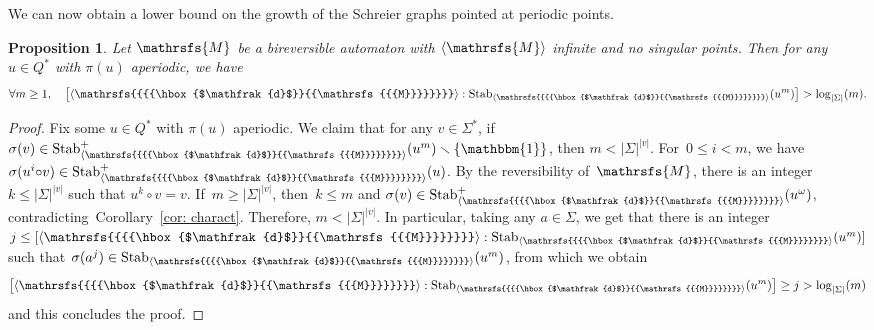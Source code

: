 \documentclass{amsart}
\newtheorem{proposition}[theorem]{Proposition}
\begin{document}
We can now obtain a lower bound on the growth of the Schreier graphs pointed at periodic points.
\begin{proposition}
Let ${{{\mathrsfs{{M}}}}}$ be a bireversible automaton with ${{{\langle}{{\mathrsfs{{{M}}}}}{\rangle}}}$ infinite and no singular points. Then for any $u\in {{{Q}}}^{*}$ with $\pi(u)$ aperiodic, we have
$$
\forall m\ge 1, \quad
\left[{{{{\langle}{{\mathrsfs{{{{\hbox{$\mathfrak{d}$}}{{\mathrsfs{{{M}}}}}}}}}}{\rangle}}}}:\operatorname{Stab}_{{{{\langle}{{\mathrsfs{{{{\hbox{$\mathfrak{d}$}}{{\mathrsfs{{{M}}}}}}}}}}{\rangle}}}}(u^{m})\right ]> \log_{|{{{\Sigma}}}|}(m).
$$
\end{proposition}
\begin{proof}
Fix some \(u\in {{{Q}}}^*\) with $\pi(u)$ aperiodic. We claim that for any $v\in {{{\Sigma}}}^{*}$, if
$\sigma(v)\in\operatorname{Stab}_{{{{\langle}{{\mathrsfs{{{{\hbox{$\mathfrak{d}$}}{{\mathrsfs{{{M}}}}}}}}}}{\rangle}}}}^{+}(u^{m})\smallsetminus\{\operatorname{\mathbbm{1}}\}$, then $m<|{{{\Sigma}}}|^{|v|}$. For~$0\le i<m$, we have $\sigma(u^{i}{{{\circ}}} v)\in \operatorname{Stab}^+_{{{{\langle}{{\mathrsfs{{{{\hbox{$\mathfrak{d}$}}{{\mathrsfs{{{M}}}}}}}}}}{\rangle}}}}(u)$. By the reversibility of~${{{\mathrsfs{{M}}}}}$, there is an integer $k\leq|{{{\Sigma}}}|^{|v|}$ such that $u^{k}{{{\circ}}} v=v$.
If~$m\geq|{{{\Sigma}}}|^{|v|}$, then~$k\leq m$ and $\sigma(v)\in \operatorname{Stab}^{+}_{{{{\langle}{{\mathrsfs{{{{\hbox{$\mathfrak{d}$}}{{\mathrsfs{{{M}}}}}}}}}}{\rangle}}}}(u^{\omega})$, contradicting~Corollary~\ref{cor: charact}. Therefore, $m<|{{{\Sigma}}}|^{|v|}$. In particular, taking any $a\in {{{\Sigma}}}$, we get that there is an integer $j\le [{{{{\langle}{{\mathrsfs{{{{\hbox{$\mathfrak{d}$}}{{\mathrsfs{{{M}}}}}}}}}}{\rangle}}}}:\operatorname{Stab}_{{{{\langle}{{\mathrsfs{{{{\hbox{$\mathfrak{d}$}}{{\mathrsfs{{{M}}}}}}}}}}{\rangle}}}}(u^{m}) ]$ such that $\sigma(a^{j})\in \operatorname{Stab}_{{{{\langle}{{\mathrsfs{{{{\hbox{$\mathfrak{d}$}}{{\mathrsfs{{{M}}}}}}}}}}{\rangle}}}}(u^{m})$, from which we obtain
$$
\left[{{{{\langle}{{\mathrsfs{{{{\hbox{$\mathfrak{d}$}}{{\mathrsfs{{{M}}}}}}}}}}{\rangle}}}}:\operatorname{Stab}_{{{{\langle}{{\mathrsfs{{{{\hbox{$\mathfrak{d}$}}{{\mathrsfs{{{M}}}}}}}}}}{\rangle}}}}(u^{m})\right ]\ge j> \log_{|{{{\Sigma}}}|}(m)
$$
and this concludes the proof.
\end{proof}
\end{document}
